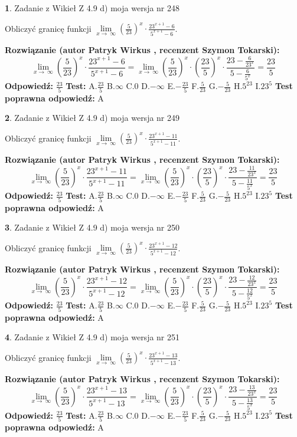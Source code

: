 \documentclass[12pt, a4paper]{article}
\theoremstyle{definition} %
\newtheorem{zad}{}
\newcommand{\zadStart}[1]{\begin{zad}#1\newline}
\newcommand{\zadStop}{\end{zad}}
\newcommand{\rozwStart}[2]{\noindent \textbf{Rozwiązanie (autor #1 , recenzent #2): }\newline}
\newcommand{\rozwStop}{\newline}
\newcommand{\odpStart}{\noindent \textbf{Odpowiedź:}\newline}
\newcommand{\odpStop}{\newline}
\newcommand{\testStart}{\noindent \textbf{Test:}\newline}
\newcommand{\testStop}{\newline}
\newcommand{\kluczStart}{\noindent \textbf{Test poprawna odpowiedź:}\newline}
\newcommand{\kluczStop}{\newline}
\begin{document}
\zadStart{Zadanie z Wikieł Z 4.9 d) moja wersja nr 248}


Obliczyć granicę funkcji  $\lim\limits_{x\to\ \infty}(\frac{5}{23})^{x}\cdot\frac{23^{x+1}-6}{5^{x+1}-6}$.
\zadStop
\rozwStart{Patryk Wirkus}{Szymon Tokarski}
$$\lim\limits_{x\to\ \infty}(\frac{5}{23})^{x}\cdot\frac{23^{x+1}-6}{5^{x+1}-6}=\lim\limits_{x\to\ \infty}(\frac{5}{23})^{x}\cdot(\frac{23}{5})^{x} \cdot \frac{23-\frac{6}{23^{x}}}{5-\frac{6}{5^{x}}} = \frac{23}{5}$$
\rozwStop
\odpStart
$\frac{23}{5}$
\odpStop
\testStart
A.$\frac{23}{5}$ B.$\infty$ C.$0$ D.$-\infty$ E.$-\frac{23}{5}$
F.$\frac{5}{23}$ G.$-\frac{5}{23}$
H.$5^{23}$
I.$23^{5}$
\testStop
\kluczStart
A
\kluczStop



\zadStart{Zadanie z Wikieł Z 4.9 d) moja wersja nr 249}


Obliczyć granicę funkcji  $\lim\limits_{x\to\ \infty}(\frac{5}{23})^{x}\cdot\frac{23^{x+1}-11}{5^{x+1}-11}$.
\zadStop
\rozwStart{Patryk Wirkus}{Szymon Tokarski}
$$\lim\limits_{x\to\ \infty}(\frac{5}{23})^{x}\cdot\frac{23^{x+1}-11}{5^{x+1}-11}=\lim\limits_{x\to\ \infty}(\frac{5}{23})^{x}\cdot(\frac{23}{5})^{x} \cdot \frac{23-\frac{11}{23^{x}}}{5-\frac{11}{5^{x}}} = \frac{23}{5}$$
\rozwStop
\odpStart
$\frac{23}{5}$
\odpStop
\testStart
A.$\frac{23}{5}$ B.$\infty$ C.$0$ D.$-\infty$ E.$-\frac{23}{5}$
F.$\frac{5}{23}$ G.$-\frac{5}{23}$
H.$5^{23}$
I.$23^{5}$
\testStop
\kluczStart
A
\kluczStop



\zadStart{Zadanie z Wikieł Z 4.9 d) moja wersja nr 250}


Obliczyć granicę funkcji  $\lim\limits_{x\to\ \infty}(\frac{5}{23})^{x}\cdot\frac{23^{x+1}-12}{5^{x+1}-12}$.
\zadStop
\rozwStart{Patryk Wirkus}{Szymon Tokarski}
$$\lim\limits_{x\to\ \infty}(\frac{5}{23})^{x}\cdot\frac{23^{x+1}-12}{5^{x+1}-12}=\lim\limits_{x\to\ \infty}(\frac{5}{23})^{x}\cdot(\frac{23}{5})^{x} \cdot \frac{23-\frac{12}{23^{x}}}{5-\frac{12}{5^{x}}} = \frac{23}{5}$$
\rozwStop
\odpStart
$\frac{23}{5}$
\odpStop
\testStart
A.$\frac{23}{5}$ B.$\infty$ C.$0$ D.$-\infty$ E.$-\frac{23}{5}$
F.$\frac{5}{23}$ G.$-\frac{5}{23}$
H.$5^{23}$
I.$23^{5}$
\testStop
\kluczStart
A
\kluczStop



\zadStart{Zadanie z Wikieł Z 4.9 d) moja wersja nr 251}


Obliczyć granicę funkcji  $\lim\limits_{x\to\ \infty}(\frac{5}{23})^{x}\cdot\frac{23^{x+1}-13}{5^{x+1}-13}$.
\zadStop
\rozwStart{Patryk Wirkus}{Szymon Tokarski}
$$\lim\limits_{x\to\ \infty}(\frac{5}{23})^{x}\cdot\frac{23^{x+1}-13}{5^{x+1}-13}=\lim\limits_{x\to\ \infty}(\frac{5}{23})^{x}\cdot(\frac{23}{5})^{x} \cdot \frac{23-\frac{13}{23^{x}}}{5-\frac{13}{5^{x}}} = \frac{23}{5}$$
\rozwStop
\odpStart
$\frac{23}{5}$
\odpStop
\testStart
A.$\frac{23}{5}$ B.$\infty$ C.$0$ D.$-\infty$ E.$-\frac{23}{5}$
F.$\frac{5}{23}$ G.$-\frac{5}{23}$
H.$5^{23}$
I.$23^{5}$
\testStop
\kluczStart
A
\kluczStop
\end{document}
